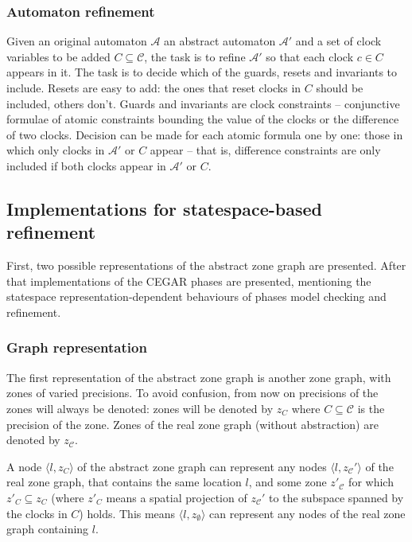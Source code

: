 

\subsubsection{Automaton refinement}

Given an original automaton $\mathcal{A}$ an abstract automaton $\mathcal{A'}$ and a set of clock variables to be added $C \subseteq \mathcal{C}$, the task is to refine $\mathcal{A'}$ so that each clock $c \in C$ appears in it. The task is to decide which of the guards, resets and invariants to include. Resets are easy to add: the ones that reset clocks in $C$ should be included, others don't. Guards and invariants are clock constraints -- conjunctive formulae of atomic constraints bounding the value of the clocks or the difference of two clocks. Decision can be made for each atomic formula one by one: those in which only clocks in $\mathcal{A'}$ or $C$ appear -- that is, difference constraints are only included if both clocks appear in $\mathcal{A'}$ or $C$.


\subsection{Implementations for statespace-based refinement}

First, two possible representations of the abstract zone graph are presented. After that implementations of the CEGAR phases are presented, mentioning the statespace representation-dependent behaviours of phases model checking and refinement.

\subsubsection{Graph representation} %
The first representation of the abstract zone graph is another zone graph, with zones of varied precisions. To avoid confusion, from now on precisions of the zones will always be denoted: zones will be denoted by $z_{C}$ where $C \subseteq \mathcal{C}$ is the precision of the zone. Zones of the real zone graph (without abstraction) are denoted by $z_{\mathcal{C}}$.

A node $\langle l, z_{C} \rangle$ of the abstract zone graph can represent any nodes $\langle l, z_{\mathcal{C}}' \rangle$ of the real zone graph, that contains the same location $l$, and some zone $z'_{\mathcal{C}}$ for which $z'_C \subseteq z_C$ (where $z'_C$ means a spatial projection of $z_{\mathcal{C}}'$ to the subspace spanned by the clocks in $C$) holds. This means $\langle l, z_{\emptyset} \rangle$ can represent any nodes of the real zone graph containing $l$. 


